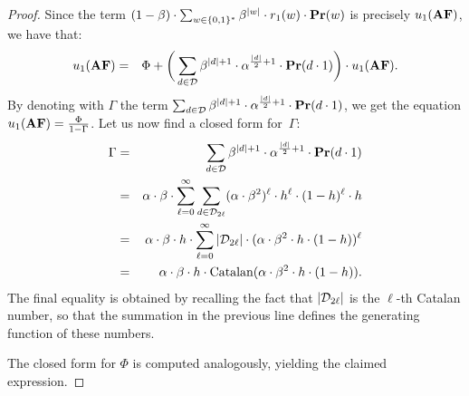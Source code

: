 \begin{proof}
%
Since the term $(1-\beta) \cdot \sum_{w\in \{0,1\}^*} \beta^{|w|} \cdot r_1(w)  \cdot \mathbf{Pr}(w)$ is precisely $u_1(\text{\rm {\bf AF}})$, we have that:
%
\begin{eqnarray*}
 u_1(\text{\rm {\bf AF}}) & = & \Phi + 
 \bigg(\sum_{d\in \mathcal{D}} \beta^{|d|+1}\cdot  \alpha^{\frac{|d|}{2}+1}\cdot \mathbf{Pr}(d\cdot 1)\bigg) \cdot  u_1(\text{\rm {\bf AF}}).
\end{eqnarray*}
%
By denoting with $\Gamma$ the term $\sum_{d\in \mathcal{D}} \beta^{|d|+1}\cdot  \alpha^{\frac{|d|}{2}+1}\cdot \mathbf{Pr}(d\cdot 1)$, we get the equation
$u_1(\text{\rm {\bf AF}}) = \frac{\Phi}{1-\Gamma}$.
Let us now find a closed form for~$\Gamma$:
%
\begin{eqnarray*}
\Gamma & = & \sum_{d\in \mathcal{D}} \beta^{|d|+1}\cdot  \alpha^{\frac{|d|}{2}+1}\cdot \mathbf{Pr}(d\cdot 1)\\
  & = & \alpha\cdot \beta \cdot \sum_{\ell = 0}^{\infty} \sum_{d\in \mathcal{D}_{2\ell}} (\alpha\cdot \beta^2)^{\ell}\cdot h^{\ell}\cdot (1-h)^{\ell}\cdot h\\
      & = &  \alpha\cdot \beta \cdot h \cdot \sum_{\ell = 0}^{\infty} |\mathcal{D}_{2\ell}| \cdot (\alpha\cdot \beta^2 \cdot h \cdot (1-h))^{\ell}\\
    & = &  \alpha\cdot \beta \cdot h \cdot \text{\rm Catalan}(\alpha\cdot\beta^2 \cdot h \cdot (1-h)).
\end{eqnarray*}
%
The final equality is obtained by recalling the fact that $|\mathcal{D}_{2\ell}|$ is the $\ell$-th Catalan number, so that the summation in the previous line defines the generating function of these numbers. 

The closed form for $\Phi$ is computed analogously, yielding the claimed expression.
\end{proof}



